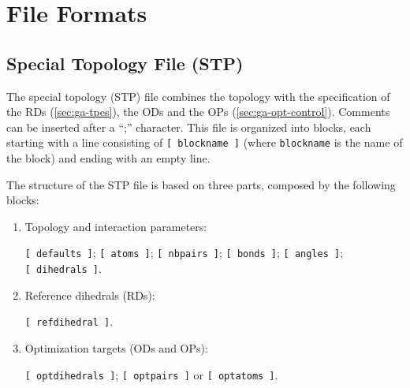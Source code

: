 \documentclass[10pt,a4paper,openany]{memoir}
\numberwithin{equation}{section}
\newcommand{\profileropt}[0]{\texttt{profilerOpt}}
\begin{document}


% 

\section{File Formats}
\label{sec:file-formats-file-formats}

\subsection{Special Topology File (STP)}
\label{sec:file-formats-STP}

The special topology (STP) file combines the topology with the
specification of the RDs (\autoref{sec:ga-tpes}), the ODs and the OPs
(\autoref{sec:ga-opt-control}). Comments can be inserted after a ``;''
character.  This file is organized into blocks, each starting with a
line consisting of \texttt{[~blockname~]} (where \texttt{blockname} is
the name of the block) and ending with an empty line.

The structure of the STP file is based on three parts, composed by the
following blocks:
\begin{enumerate}
\item Topology and interaction parameters:\par \texttt{[~defaults~]}; \texttt{[~atoms~]}; \texttt{[~nbpairs~]}; \texttt{[~bonds~]}; \texttt{[~angles~]}; \texttt{[~dihedrals~]}.
\item Reference dihedrals (RDs):\par\texttt{[~refdihedral~]}.
\item Optimization targets (ODs and OPs):\par\texttt{[~optdihedrals~]}; \texttt{[~optpairs~]} or \texttt{[~optatoms~]}.
\end{enumerate}
\end{document}
